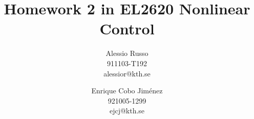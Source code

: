 \documentclass[a4paper,twocolumn]{article} %
\begin{document}

\title{Homework 2 in EL2620 Nonlinear Control}
\author{Alessio Russo \\ 911103-T192 \\ alessior@kth.se \and Enrique Cobo Jim\'enez\\
  921005-1299 \\ ejcj@kth.se}

\maketitle                     %















\end{document}

